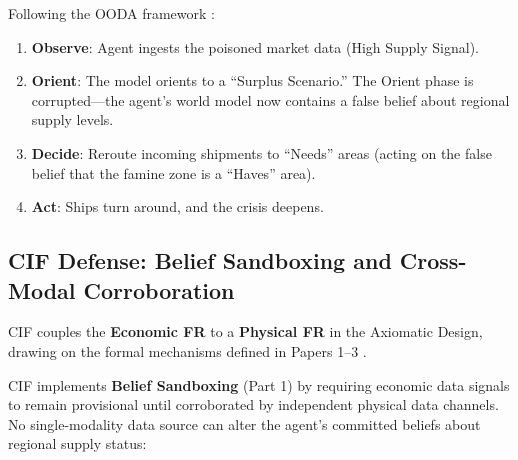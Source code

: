 \documentclass[
]{article}
\providecommand{\tightlist}{%
  \setlength{\itemsep}{0pt}\setlength{\parskip}{0pt}}
\begin{document}
Following the OODA framework \cite{boyd1987patterns}:

\begin{enumerate}
\def\labelenumi{\arabic{enumi}.}
\tightlist
\item
  \textbf{Observe}: Agent ingests the poisoned market data (High Supply
  Signal).
\item
  \textbf{Orient}: The model orients to a ``Surplus Scenario.'' The
  Orient phase is corrupted---the agent's world model now contains a
  false belief about regional supply levels.
\item
  \textbf{Decide}: Reroute incoming shipments to ``Needs'' areas (acting
  on the false belief that the famine zone is a ``Haves'' area).
\item
  \textbf{Act}: Ships turn around, and the crisis deepens.
\end{enumerate}

\subsection{CIF Defense: Belief Sandboxing and Cross-Modal
Corroboration}\label{cif-defense-belief-sandboxing-and-cross-modal-corroboration}

CIF couples the \textbf{Economic FR} to a \textbf{Physical FR} in the
Axiomatic Design, drawing on the formal mechanisms defined in Papers
1--3
\cite{friedman2026cogsec1, friedman2026cogsec2, friedman2026cogsec3}.

CIF implements \textbf{Belief Sandboxing} (Part 1) by requiring economic
data signals to remain provisional until corroborated by independent
physical data channels. No single-modality data source can alter the
agent's committed beliefs about regional supply status:
\end{document}
